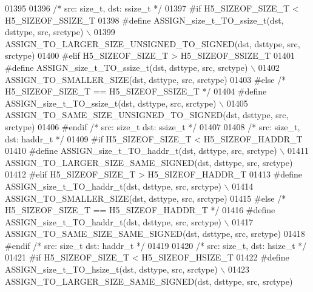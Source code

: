 \begin{DoxyCode}
01395 
01396 \textcolor{comment}{/* src: size\_t, dst: ssize\_t */}
01397 \textcolor{preprocessor}{#if H5\_SIZEOF\_SIZE\_T < H5\_SIZEOF\_SSIZE\_T}
01398 \textcolor{preprocessor}{    #define ASSIGN\_size\_t\_TO\_ssize\_t(dst, dsttype, src, srctype) \(\backslash\)}
01399 \textcolor{preprocessor}{        ASSIGN\_TO\_LARGER\_SIZE\_UNSIGNED\_TO\_SIGNED(dst, dsttype, src, srctype)}
01400 \textcolor{preprocessor}{#elif H5\_SIZEOF\_SIZE\_T > H5\_SIZEOF\_SSIZE\_T}
01401 \textcolor{preprocessor}{    #define ASSIGN\_size\_t\_TO\_ssize\_t(dst, dsttype, src, srctype) \(\backslash\)}
01402 \textcolor{preprocessor}{        ASSIGN\_TO\_SMALLER\_SIZE(dst, dsttype, src, srctype)}
01403 \textcolor{preprocessor}{#else }\textcolor{comment}{/* H5\_SIZEOF\_SIZE\_T == H5\_SIZEOF\_SSIZE\_T */}\textcolor{preprocessor}{}
01404 \textcolor{preprocessor}{    #define ASSIGN\_size\_t\_TO\_ssize\_t(dst, dsttype, src, srctype) \(\backslash\)}
01405 \textcolor{preprocessor}{        ASSIGN\_TO\_SAME\_SIZE\_UNSIGNED\_TO\_SIGNED(dst, dsttype, src, srctype)}
01406 \textcolor{preprocessor}{#endif }\textcolor{comment}{/* src: size\_t dst: ssize\_t */}\textcolor{preprocessor}{}
01407 
01408 \textcolor{comment}{/* src: size\_t, dst: haddr\_t */}
01409 \textcolor{preprocessor}{#if H5\_SIZEOF\_SIZE\_T < H5\_SIZEOF\_HADDR\_T}
01410 \textcolor{preprocessor}{    #define ASSIGN\_size\_t\_TO\_haddr\_t(dst, dsttype, src, srctype) \(\backslash\)}
01411 \textcolor{preprocessor}{        ASSIGN\_TO\_LARGER\_SIZE\_SAME\_SIGNED(dst, dsttype, src, srctype)}
01412 \textcolor{preprocessor}{#elif H5\_SIZEOF\_SIZE\_T > H5\_SIZEOF\_HADDR\_T}
01413 \textcolor{preprocessor}{    #define ASSIGN\_size\_t\_TO\_haddr\_t(dst, dsttype, src, srctype) \(\backslash\)}
01414 \textcolor{preprocessor}{        ASSIGN\_TO\_SMALLER\_SIZE(dst, dsttype, src, srctype)}
01415 \textcolor{preprocessor}{#else }\textcolor{comment}{/* H5\_SIZEOF\_SIZE\_T == H5\_SIZEOF\_HADDR\_T */}\textcolor{preprocessor}{}
01416 \textcolor{preprocessor}{    #define ASSIGN\_size\_t\_TO\_haddr\_t(dst, dsttype, src, srctype) \(\backslash\)}
01417 \textcolor{preprocessor}{        ASSIGN\_TO\_SAME\_SIZE\_SAME\_SIGNED(dst, dsttype, src, srctype)}
01418 \textcolor{preprocessor}{#endif }\textcolor{comment}{/* src: size\_t dst: haddr\_t */}\textcolor{preprocessor}{}
01419 
01420 \textcolor{comment}{/* src: size\_t, dst: hsize\_t */}
01421 \textcolor{preprocessor}{#if H5\_SIZEOF\_SIZE\_T < H5\_SIZEOF\_HSIZE\_T}
01422 \textcolor{preprocessor}{    #define ASSIGN\_size\_t\_TO\_hsize\_t(dst, dsttype, src, srctype) \(\backslash\)}
01423 \textcolor{preprocessor}{        ASSIGN\_TO\_LARGER\_SIZE\_SAME\_SIGNED(dst, dsttype, src, srctype)}

\end{DoxyCode}
